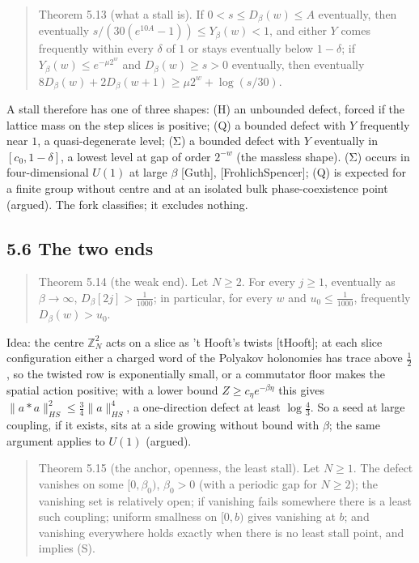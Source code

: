 \documentclass[10pt,letterpaper,twocolumn]{article}
\begin{document}
\begin{quote}
Theorem 5.13 (what a stall is). If \(0<s\le D_\beta(w)\le A\) eventually, then eventually \(s/(30(e^{10A}-1))\le Y_\beta(w)<1\), and either \(Y\) comes frequently within every \(\delta\) of \(1\) or stays eventually below \(1-\delta\); if \(Y_\beta(w)\le e^{-\mu2^w}\) and \(D_\beta(w)\ge s>0\) eventually, then eventually \(8D_\beta(w)+2D_\beta(w+1)\ge\mu2^w+\log(s/30)\).
\end{quote}

A stall therefore has one of three shapes: (H) an unbounded defect, forced if the lattice mass on the step slices is positive; (Q) a bounded defect with \(Y\) frequently near \(1\), a quasi-degenerate level; (Σ) a bounded defect with \(Y\) eventually in \([c_0,1-\delta]\), a lowest level at gap of order \(2^{-w}\) (the massless shape). (Σ) occurs in four-dimensional \(U(1)\) at large \(\beta\) {[}Guth{]}, {[}FrohlichSpencer{]}; (Q) is expected for a finite group without centre and at an isolated bulk phase-coexistence point (argued). The fork classifies; it excludes nothing.

\subsection{5.6 The two ends}\label{56-the-two-ends}

\begin{quote}
Theorem 5.14 (the weak end). Let \(N\ge2\). For every \(j\ge1\), eventually as \(\beta\to\infty\), \(D_\beta[2j]>\tfrac1{1000}\); in particular, for every \(w\) and \(u_0\le\tfrac1{1000}\), frequently \(D_\beta(w)>u_0\).
\end{quote}

Idea: the centre \(\mathbb Z_N^2\) acts on a slice as 't Hooft's twists {[}tHooft{]}; at each slice configuration either a charged word of the Polyakov holonomies has trace above \(\tfrac12\), so the twisted row is exponentially small, or a commutator floor makes the spatial action positive; with a lower bound \(Z\ge c_\eta e^{-\beta\eta}\) this gives \(\|a\ast a\|_{HS}^2\le\tfrac34\|a\|_{HS}^4\), a one-direction defect at least \(\log\tfrac43\). So a seed at large coupling, if it exists, sits at a side growing without bound with \(\beta\); the same argument applies to \(U(1)\) (argued).

\begin{quote}
Theorem 5.15 (the anchor, openness, the least stall). Let \(N\ge1\). The defect vanishes on some \([0,\beta_0)\), \(\beta_0>0\) (with a periodic gap for \(N\ge2\)); the vanishing set is relatively open; if vanishing fails somewhere there is a least such coupling; uniform smallness on \([0,b)\) gives vanishing at \(b\); and vanishing everywhere holds exactly when there is no least stall point, and implies (S).
\end{quote}
\end{document}
